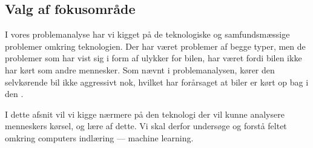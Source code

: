 \subsection{Valg af fokusområde}
I vores problemanalyse har vi kigget på de teknologiske og samfundsmæssige problemer omkring teknologien. Der har været problemer af begge typer, men de problemer som har vist sig i form af ulykker for bilen, har været fordi bilen ikke har kørt som andre mennesker. Som nævnt i problemanalysen, kører den selvkørende bil ikke aggressivt nok, hvilket har forårsaget at biler er kørt op bag i den \cite{VOX}.

I dette afsnit vil vi kigge nærmere på den teknologi der vil kunne analysere menneskers kørsel, og lære af dette. Vi skal derfor undersøge og forstå feltet omkring computers indlæring --- machine learning.